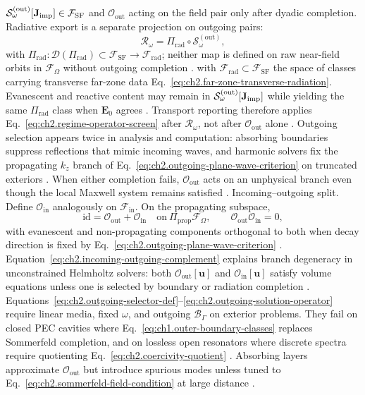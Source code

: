 $\mathcal{S}_\omega^{\mathrm{(out)}}[\mathbf{J}_{\mathrm{imp}}]\in\mathcal{F}_{\mathrm{SF}}$ and $\mathcal{O}_{\mathrm{out}}$ acting on the field pair only after dyadic completion.
Radiative export is a separate projection on outgoing pairs:
\begin{equation}
\label{eq:ch2.rad-projection-composition}
\mathcal{R}_\omega
=
\Pi_{\mathrm{rad}}\circ\mathcal{S}_\omega^{\mathrm{(out)}},
\end{equation}
with $\Pi_{\mathrm{rad}}:\mathcal{D}(\Pi_{\mathrm{rad}})\subset\mathcal{F}_{\mathrm{SF}}\to\mathcal{F}_{\mathrm{rad}}$; neither map is defined on raw near-field orbits in $\mathcal{F}_\Omega$ without outgoing completion \cite{stratton1941}.
with $\mathcal{F}_{\mathrm{rad}}\subset\mathcal{F}_{\mathrm{SF}}$ the space of classes carrying transverse far-zone data Eq.~\eqref{eq:ch2.far-zone-transverse-radiation}.
Evanescent and reactive content may remain in $\mathcal{S}_\omega^{\mathrm{(out)}}[\mathbf{J}_{\mathrm{imp}}]$ while yielding the same $\Pi_{\mathrm{rad}}$ class when $\mathbf{E}_0$ agrees \cite{stratton1941}.
Transport reporting therefore applies Eq.~\eqref{eq:ch2.regime-operator-screen} after $\mathcal{R}_\omega$, not after $\mathcal{O}_{\mathrm{out}}$ alone \cite{harrington2001}.
Outgoing selection appears twice in analysis and computation: absorbing boundaries suppress
reflections that mimic incoming waves, and harmonic solvers fix the propagating
$k_z$ branch of Eq.~\eqref{eq:ch2.outgoing-plane-wave-criterion} on truncated exteriors
\cite{hansen1988,stratton1941}. When either completion fails, $\mathcal{O}_{\mathrm{out}}$ acts on
an unphysical branch even though the local Maxwell system remains satisfied \cite{harrington2001}.
Incoming--outgoing split. Define \(\mathcal{O}_{\mathrm{in}}\) analogously on \(\mathcal{F}_{\mathrm{in}}\).
On the propagating subspace,
\begin{equation}
\label{eq:ch2.incoming-outgoing-complement}
\mathrm{id}
=
\mathcal{O}_{\mathrm{out}}+\mathcal{O}_{\mathrm{in}}
\quad\text{on}\ \Pi_{\mathrm{prop}}\mathcal{F}_\Omega,
\qquad
\mathcal{O}_{\mathrm{out}}\mathcal{O}_{\mathrm{in}}=0,
\end{equation}
with evanescent and non-propagating components orthogonal to both when decay
direction is fixed by Eq.~\eqref{eq:ch2.outgoing-plane-wave-criterion}
\cite{stratton1941}. Equation~\eqref{eq:ch2.incoming-outgoing-complement}
explains branch degeneracy in unconstrained Helmholtz solvers: both
\(\mathcal{O}_{\mathrm{out}}[\mathbf{u}]\) and
\(\mathcal{O}_{\mathrm{in}}[\mathbf{u}]\) satisfy volume equations unless one is
selected by boundary or radiation completion \cite{jackson1999}.
Equations~\eqref{eq:ch2.outgoing-selector-def}--\eqref{eq:ch2.outgoing-solution-operator}
require linear media, fixed \(\omega\), and outgoing \(\mathcal{B}_\Gamma\) on
exterior problems. They fail on closed PEC cavities where
Eq.~\eqref{eq:ch1.outer-boundary-classes} replaces Sommerfeld completion, and on
lossless open resonators where discrete spectra require quotienting
Eq.~\eqref{eq:ch2.coercivity-quotient} \cite{stratton1941}.
Absorbing layers approximate \(\mathcal{O}_{\mathrm{out}}\) but introduce spurious
modes unless tuned to Eq.~\eqref{eq:ch2.sommerfeld-field-condition} at large distance
\cite{harrington2001}.
